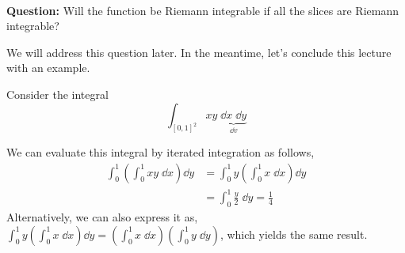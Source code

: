 \documentclass[../Analysis-3.tex]{subfiles}
\begin{document}
\

\textbf{Question:} Will the function be Riemann integrable if all the slices are Riemann integrable?

We will address this question later. In the meantime, let's conclude this lecture with an example.

\begin{Eg}{}{}
  Consider the integral
  \[ \int_{[0,1]^2} xy \; \underbrace{\dd x \; \dd y}_{\dd v} \]

  We can evaluate this integral by iterated integration as follows,
  \begin{align*}
    \int_{0}^{1} \left( \int_{0}^{1} xy \; \dd x \right) \dd y
     & = \int_{0}^{1} y \left( \int_{0}^{1} x \; \dd x \right) \dd y \\
     & = \int_{0}^{1} \frac{y}{2} \; \dd y = \frac{1}{4}
  \end{align*}
  Alternatively, we can also express it as, $ \displaystyle \int_{0}^{1} y \left( \int_{0}^{1} x \; \dd x \right) \dd y = \left( \int_{0}^{1} x \; \dd x \right) \left( \int_{0}^{1} y \; \dd y \right) $, which yields the same result.
\end{Eg}
\end{document}
